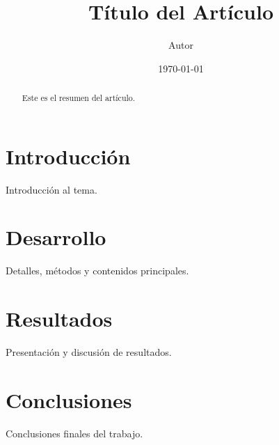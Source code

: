 \documentclass[12pt]{article}
\title{Título del Artículo}
\author{Autor}
\date{\today}
\begin{document}
\maketitle

\begin{abstract}
Este es el resumen del artículo.
\end{abstract}

\section{Introducción}
Introducción al tema.

\section{Desarrollo}
Detalles, métodos y contenidos principales.

\section{Resultados}
Presentación y discusión de resultados.

\section{Conclusiones}
Conclusiones finales del trabajo.



\end{document}
